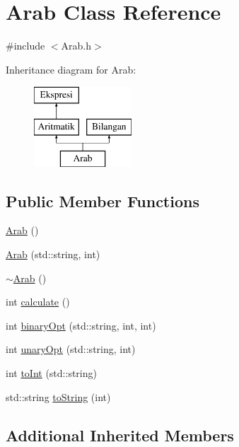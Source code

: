 \hypertarget{class_arab}{}\section{Arab Class Reference}
\label{class_arab}


{\ttfamily \#include $<$Arab.\+h$>$}

Inheritance diagram for Arab\+:\begin{figure}[H]
\begin{center}
\leavevmode
\includegraphics[height=3.000000cm]{class_arab}
\end{center}
\end{figure}
\subsection*{Public Member Functions}
\begin{DoxyCompactItemize}
\item 
\hyperlink{class_arab_afdddf6ff9c7724ddb71c625db0847893}{Arab} ()
\item 
\hyperlink{class_arab_a980e87ff4bcc914e8206b8850bc19f2b}{Arab} (std\+::string, int)
\item 
\hyperlink{class_arab_a2629b0540731753334ebb19161774f7a}{$\sim$\+Arab} ()
\item 
int \hyperlink{class_arab_a0200f0365cfc5ef5a35cac273f86ad0b}{calculate} ()
\item 
int \hyperlink{class_arab_aa9dfc0b92e76397bbd905ceeeebeaa45}{binary\+Opt} (std\+::string, int, int)
\item 
int \hyperlink{class_arab_a7dd22fd64705866419cc5b73c7231959}{unary\+Opt} (std\+::string, int)
\item 
int \hyperlink{class_arab_aa8eac0f26197eb68fa1753a7c33a6f2c}{to\+Int} (std\+::string)
\item 
std\+::string \hyperlink{class_arab_a051a742948dbc9f296b05436af050b4d}{to\+String} (int)
\end{DoxyCompactItemize}
\subsection*{Additional Inherited Members}



